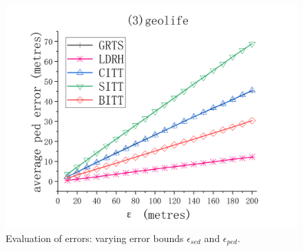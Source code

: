 {\begin{figure}[tb!]
	\includegraphics[scale = 0.580]{figures/Fig-geolife-ped-error.png}\hspace{0ex}
	\vspace{-1ex}
	\caption{\small Evaluation of \ped errors: varying error bounds $\epsilon_{sed}$ and $\epsilon_{ped}$.}
	\label{fig:ped-error}
	\vspace{-1ex}
\end{figure}

}

